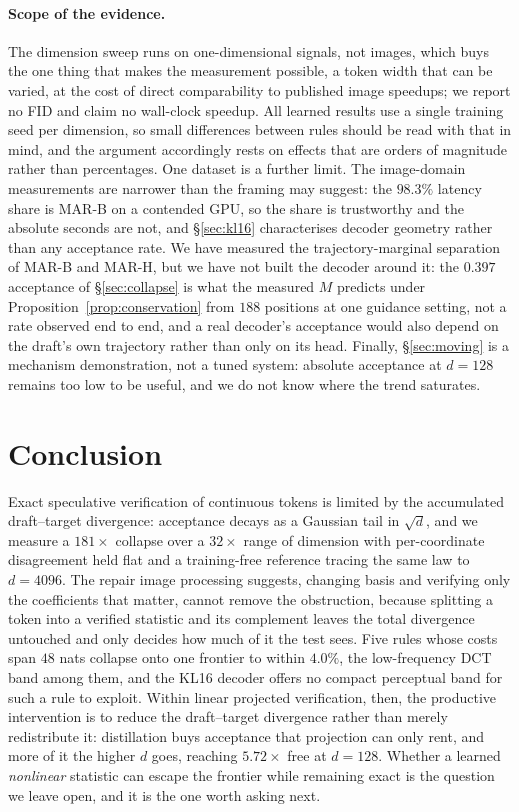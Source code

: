 \documentclass[10pt]{article}
\newcommand{\dd}{d}
\newcommand{\best}[1]{\bm{#1}}
\begin{document}
\paragraph{Scope of the evidence.} The dimension sweep runs on one-dimensional signals, not images,
which buys the one thing that makes the measurement possible, a token width that can be varied, at
the cost of direct comparability to published image speedups; we report no FID and claim no
wall-clock speedup. All learned results use a single training seed per dimension, so small
differences between rules should be read with that in mind, and the argument accordingly rests on
effects that are orders of magnitude rather than percentages. One dataset is a further limit. The
image-domain measurements are narrower than the framing may suggest: the $98.3\%$ latency share is
MAR-B on a contended GPU, so the share is trustworthy and the absolute seconds are not, and
\S\ref{sec:kl16} characterises decoder geometry rather than any acceptance rate. We have measured the
trajectory-marginal separation of MAR-B and MAR-H, but we have not built the decoder around it: the
$0.397$ acceptance of \S\ref{sec:collapse} is what the measured $M$ predicts under
Proposition~\ref{prop:conservation} from $188$ positions at one guidance setting, not a rate observed
end to end, and a real decoder's acceptance would also depend on the draft's own trajectory rather
than only on its head. Finally, \S\ref{sec:moving} is a mechanism demonstration, not a tuned system:
absolute acceptance at $\dd{=}128$ remains too low to be useful, and we do not know where the trend
saturates.

\section{Conclusion}

Exact speculative verification of continuous tokens is limited by the accumulated draft--target
divergence: acceptance decays as a Gaussian tail in $\sqrt{\dd}$, and we measure a $181\times$
collapse over a $32\times$ range of dimension with per-coordinate disagreement held flat and a
training-free reference tracing the same law to $\dd = 4096$. The repair image processing suggests,
changing basis and verifying only the coefficients that matter, cannot remove the obstruction,
because splitting a token into a verified statistic and its complement leaves the total divergence
untouched and only decides how much of it the test sees. Five rules whose costs span $48$ nats
collapse onto one frontier to within $\best{4.0\%}$, the low-frequency DCT band among them, and the
KL16 decoder offers no compact perceptual band for such a rule to exploit. Within linear projected
verification, then, the productive intervention is to reduce the draft--target divergence rather than
merely redistribute it: distillation buys acceptance that projection can only rent, and more of it
the higher $\dd$ goes, reaching $\best{5.72\times}$ free at $\dd{=}128$. Whether a learned
\emph{nonlinear} statistic can escape the frontier while remaining exact is the question we leave
open, and it is the one worth asking next.




\appendix

\end{document}
